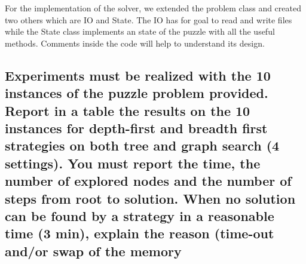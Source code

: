 \documentclass[a4paper,10pt]{article}
\begin{document}
	For the implementation of the solver, we extended the problem class and created two others which are IO and State. The IO has for goal to read and write files while the State class implements an state of the puzzle with all the useful methods. Comments inside the code will help to understand its design.
	
	\subsection{Experiments must be realized with the 10 instances of the puzzle problem provided. Report in a table the results on the 10 instances for depth-first and breadth first strategies on both tree and graph search (4 settings). You must report the time, the number of explored nodes and the number of steps from root to solution. When no solution can be found by a strategy in a reasonable time (3 min), explain the reason (time-out and/or swap of the memory}
	
\end{document}
